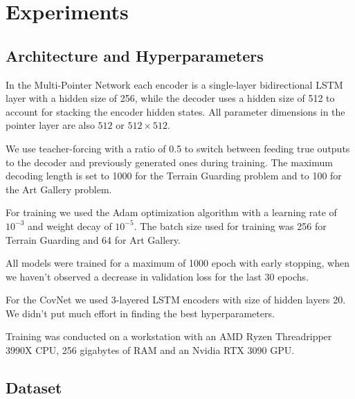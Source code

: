\documentclass{article}
\newcommand{\todoauth}[1]{\todo[color=green!40]{#1}}
\begin{document}
\section{Experiments} 

\subsection{Architecture and Hyperparameters} \todoauth{Antonio}

In the Multi-Pointer Network each encoder is a single-layer bidirectional LSTM layer with a hidden size of 256, while the decoder uses a hidden size of 512 to account for stacking the encoder hidden states. All parameter dimensions in the pointer layer are also $512$ or $512 \times 512$.

We use teacher-forcing with a ratio of 0.5 to switch between feeding true outputs to the decoder and previously generated ones during training. The maximum decoding length is set to 1000 for the Terrain Guarding problem and to 100 for the Art Gallery problem.

For training we used the Adam optimization algorithm with a learning rate of $10^{-3}$ and weight decay of $10^{-5}$. The batch size used for training was 256 for Terrain Guarding and 64 for Art Gallery. 

All models were trained for a maximum of 1000 epoch with early stopping, when we haven't observed a decrease in validation loss for the last 30 epochs.

For the CovNet we used 3-layered LSTM encoders with size of hidden layers 20.
We didn't put much effort in finding the best hyperparameters. 

Training was conducted on a workstation with an AMD Ryzen Threadripper 3990X CPU, 256 gigabytes of RAM and an Nvidia RTX 3090 GPU.

\subsection{Dataset}
\end{document}
